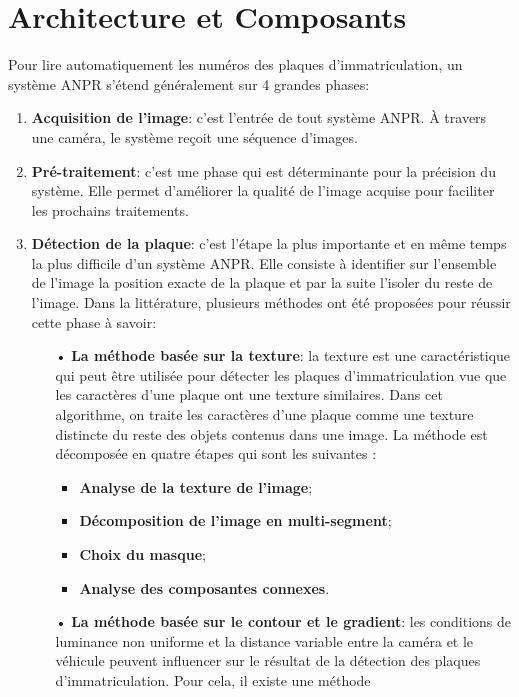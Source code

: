 \section{Architecture et Composants}
Pour lire automatiquement les numéros des plaques d’immatriculation, un système ANPR s’étend généralement sur 4 grandes phases:
\begin{enumerate}
    \item \textbf{Acquisition de l’image}: c’est l’entrée de tout système ANPR. À travers une caméra, le système reçoit une séquence d’images.
    \item \textbf{Pré-traitement}: c’est une phase qui est déterminante pour la précision du système. Elle permet d’améliorer la qualité de l’image acquise pour faciliter les prochains traitements.
    \item \textbf{Détection de la plaque}: c’est l’étape la plus importante et en même temps la plus difficile d’un système ANPR. Elle consiste à identifier sur l’ensemble de l’image la position exacte de la plaque et par la suite l’isoler du reste de l’image. Dans la littérature, plusieurs méthodes ont été proposées pour réussir cette phase à savoir:
        \begin{itemize}
            \item[•] \textbf{La méthode basée sur la texture}: la texture est une caractéristique qui peut être utilisée pour détecter les plaques d’immatriculation vue
            que les caractères d’une plaque ont une texture similaires. Dans cet algorithme, on traite les caractères
            d’une plaque comme une texture distincte du reste des objets contenus dans une image. La méthode est
            décomposée en quatre étapes qui sont les suivantes :
                \begin{itemize}
                    \item \textbf{Analyse de la texture de l’image};
                    \item \textbf{Décomposition de l’image en multi-segment};
                    \item \textbf{Choix du masque};
                    \item \textbf{Analyse des composantes connexes}.
                \end{itemize}
            \item[•] \textbf{La méthode basée sur le contour et le gradient}: les conditions de luminance non uniforme et la distance variable entre la caméra et le véhicule peuvent
            influencer sur le résultat de la détection des plaques d’immatriculation. Pour cela, il existe une méthode

\end{itemize}
\end{enumerate}
